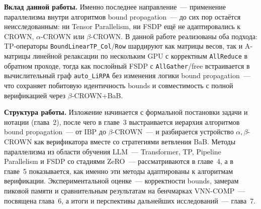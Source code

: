 \textbf{Вклад данной работы.}
Именно последнее направление~--- применение параллелизма внутри
алгоритмов bound propagation~--- до сих пор остаётся неисследованным:
ни Tensor Parallelism, ни FSDP ещё не адаптировались к CROWN,
$\alpha$-CROWN или $\beta$-CROWN.
В данной работе реализованы оба подхода: TP-операторы
\texttt{BoundLinearTP\_Col}/\texttt{Row} шардируют как матрицы весов,
так и A-матрицы линейной релаксации по нескольким GPU с корректным
\texttt{AllReduce} в обратном проходе, тогда как послойный FSDP
с \texttt{AllGather}/free встраивается в вычислительный граф
\texttt{auto\_LiRPA} без изменения логики bound propagation~---
что сохраняет побитовую идентичность bounds и совместимость
с полной верификацией через $\beta$-CROWN+BaB.

\textbf{Структура работы.}
Изложение начинается с формальной постановки задачи и нотации
(глава~2), после чего в главе~3 выстраивается иерархия алгоритмов
bound propagation~--- от IBP до $\beta$-CROWN~--- и разбирается
устройство $\alpha,\beta$-CROWN как верификатора вместе
со стратегиями ветвления BaB.
Методы параллелизма из области обучения LLM~--- Transformer,
TP, Pipeline Parallelism и FSDP со стадиями ZeRO~---
рассматриваются в главе~4, а в главе~5 показывается, как именно
эти методы адаптированы к алгоритмам верификации.
Экспериментальной оценке~--- корректности bounds, замерам пиковой
памяти и сравнительным результатам на бенчмарках VNN-COMP~---
посвящена глава~6, а итоги и перспективы дальнейших
исследований~--- глава~7.

